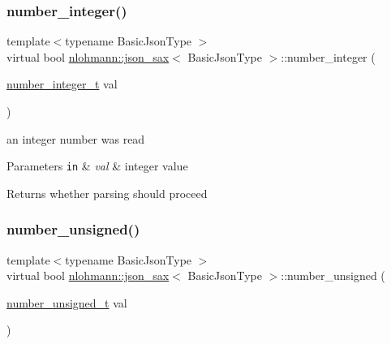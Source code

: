 \subsubsection{\texorpdfstring{number\+\_\+integer()}{number\_integer()}}
{\footnotesize\ttfamily template$<$typename Basic\+Json\+Type $>$ \\
virtual bool \hyperlink{structnlohmann_1_1json__sax}{nlohmann\+::json\+\_\+sax}$<$ Basic\+Json\+Type $>$\+::number\+\_\+integer (\begin{DoxyParamCaption}\item[{\hyperlink{structnlohmann_1_1json__sax_a0cef30121f02b7fee85e9708148ea0aa}{number\+\_\+integer\+\_\+t}}]{val }\end{DoxyParamCaption})\hspace{0.3cm}{\ttfamily [pure virtual]}}



an integer number was read 


\begin{DoxyParams}[1]{Parameters}
\mbox{\tt in}  & {\em val} & integer value \\
\hline
\end{DoxyParams}
\begin{DoxyReturn}{Returns}
whether parsing should proceed 
\end{DoxyReturn}
\mbox{\label{structnlohmann_1_1json__sax_ad9b253083e0509923ba195136f49face}} 
\subsubsection{\texorpdfstring{number\+\_\+unsigned()}{number\_unsigned()}}
{\footnotesize\ttfamily template$<$typename Basic\+Json\+Type $>$ \\
virtual bool \hyperlink{structnlohmann_1_1json__sax}{nlohmann\+::json\+\_\+sax}$<$ Basic\+Json\+Type $>$\+::number\+\_\+unsigned (\begin{DoxyParamCaption}\item[{\hyperlink{structnlohmann_1_1json__sax_a32028cc056ae0f43aaae331cdbbbf856}{number\+\_\+unsigned\+\_\+t}}]{val }\end{DoxyParamCaption})\hspace{0.3cm}{\ttfamily [pure virtual]}}



